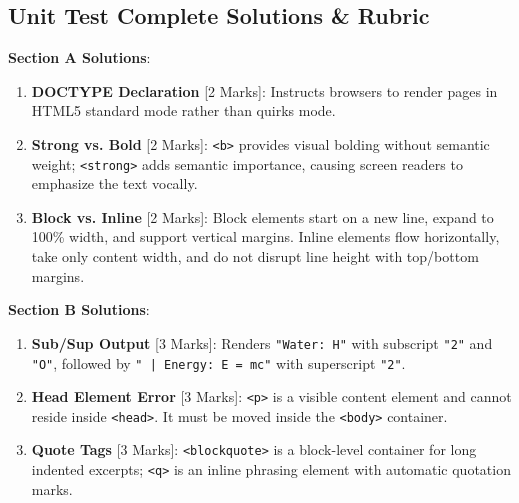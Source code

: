 \subsection{Unit Test Complete Solutions \& Rubric}

\begin{solutionbox}
\noindent\textbf{Section A Solutions}:
\begin{enumerate}
    \item \textbf{DOCTYPE Declaration} [2 Marks]: Instructs browsers to render pages in HTML5 standard mode rather than quirks mode.
    \item \textbf{Strong vs. Bold} [2 Marks]: \texttt{<b>} provides visual bolding without semantic weight; \texttt{<strong>} adds semantic importance, causing screen readers to emphasize the text vocally.
    \item \textbf{Block vs. Inline} [2 Marks]: Block elements start on a new line, expand to 100\% width, and support vertical margins. Inline elements flow horizontally, take only content width, and do not disrupt line height with top/bottom margins.
\end{enumerate}

\noindent\textbf{Section B Solutions}:
\begin{enumerate}[start=4]
    \item \textbf{Sub/Sup Output} [3 Marks]: Renders \texttt{"Water: H"} with subscript \texttt{"2"} and \texttt{"O"}, followed by \texttt{" | Energy: E = mc"} with superscript \texttt{"2"}.
    \item \textbf{Head Element Error} [3 Marks]: \texttt{<p>} is a visible content element and cannot reside inside \texttt{<head>}. It must be moved inside the \texttt{<body>} container.
    \item \textbf{Quote Tags} [3 Marks]: \texttt{<blockquote>} is a block-level container for long indented excerpts; \texttt{<q>} is an inline phrasing element with automatic quotation marks.
\end{enumerate}


\end{solutionbox}
